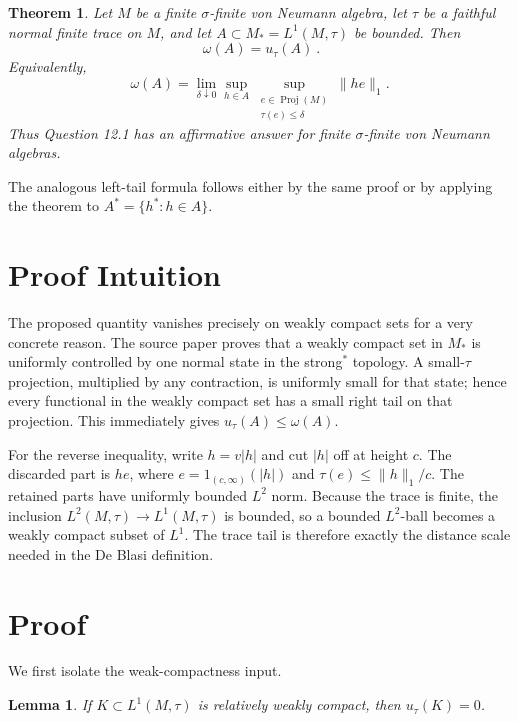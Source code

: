 \documentclass[11pt]{article}
\newtheorem{theorem}{Theorem}
\newtheorem{lemma}{Lemma}
\newcommand{\Proj}{\operatorname{Proj}}
\newcommand{\uu}{u_\tau}
\begin{document}
\begin{theorem}\label{thm:main}
Let $M$ be a finite $\sigma$-finite von Neumann algebra, let $\tau$ be a
faithful normal finite trace on $M$, and let $A\subset M_*=L^1(M,\tau)$ be
bounded. Then
\[
 \boxed{\ \omega(A)=\uu(A)\ }.
\]
Equivalently,
\[
 \omega(A)=\lim_{\delta\downarrow0}
 \sup_{h\in A}\sup_{\substack{e\in\Proj(M)\\\tau(e)\leq\delta}}
 \|he\|_1.
\]
Thus Question 12.1 has an affirmative answer for finite $\sigma$-finite von
Neumann algebras.
\end{theorem}

The analogous left-tail formula follows either by the same proof or by applying
the theorem to $A^*=\{h^*:h\in A\}$.

\section{Proof Intuition}

The proposed quantity vanishes precisely on weakly compact sets for a very
concrete reason. The source paper proves that a weakly compact set in $M_*$ is
uniformly controlled by one normal state in the strong$^*$ topology. A
small-$\tau$ projection, multiplied by any contraction, is uniformly small for
that state; hence every functional in the weakly compact set has a small right
tail on that projection. This immediately gives $\uu(A)\leq\omega(A)$.

For the reverse inequality, write $h=v|h|$ and cut $|h|$ off at height $c$.
The discarded part is $he$, where $e=1_{(c,\infty)}(|h|)$ and
$\tau(e)\leq\|h\|_1/c$. The retained parts have uniformly bounded $L^2$ norm.
Because the trace is finite, the inclusion $L^2(M,\tau)\to L^1(M,\tau)$ is
bounded, so a bounded $L^2$-ball becomes a weakly compact subset of $L^1$.
The trace tail is therefore exactly the distance scale needed in the De Blasi
definition.

\section{Proof}

We first isolate the weak-compactness input.

\begin{lemma}\label{lem:wc-tail}
If $K\subset L^1(M,\tau)$ is relatively weakly compact, then
$\uu(K)=0$.
\end{lemma}
\end{document}
